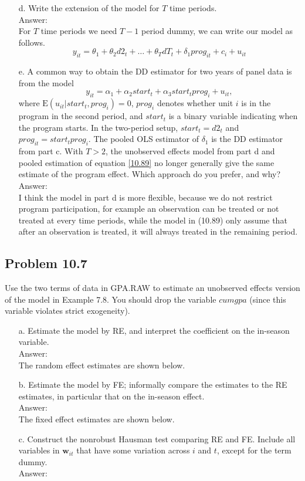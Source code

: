 \documentclass[10pt]{article}
\newcommand{\E}{\text{E}}
\begin{document}
\begin{enumerate}
\item[d.] Write the extension of the model for $T$ time periods.
\\ Answer: \\
For $T$ time periods we need $T-1$ period dummy, we can write our model as follows.
\[y_{it}=\theta_1+\theta_2d2_t+\ldots+\theta_T dT_t+\delta_1prog_{it}+c_i+u_{it}\]

\item[e.] A common way to obtain the DD estimator for two years of panel data is from the model
\[y_{it}=\alpha_1+\alpha_2 start_t+\alpha_3 start_t prog_i+u_{it}, \tag{10.89}\label{10.89}\]
where $\E(u_{it}|start_t,prog_i)=0$, $prog_i$ denotes whether unit $i$ is in the program in the second period, and $start_t$ is a binary variable indicating when the program starts. In the two-period setup, $start_t=d2_t$ and $prog_{it}=start_t prog_i$. The pooled OLS estimator of $\delta_1$ is the DD estimator from part c. With $T>2$, the unobserved effects model from part d and pooled estimation of equation \eqref{10.89} no longer generally give the same estimate of the program effect. Which approach do you prefer, and why?
\\ Answer: \\
I think the model in part d is more flexible, because we do not restrict program participation, for example an observation can be treated or not treated at every time periods, while the model in (10.89) only assume that after an observation is treated, it will always treated in the remaining period.

\end{enumerate}

\subsection*{Problem 10.7}
Use the two terms of data in GPA.RAW to estimate an unobserved effects version of the model in Example 7.8. You should drop the variable $cumgpa$ (since this variable violates strict exogeneity).
\begin{enumerate}
\item[a.] Estimate the model by RE, and interpret the coefficient on the in-season variable. 
\\ Answer: \\
The random effect estimates are shown below.\\


\item[b.] Estimate the model by FE; informally compare the estimates to the RE estimates, in particular that on the in-season effect. 
\\ Answer: \\
The fixed effect estimates are shown below.\\


\item[c.] Construct the nonrobust Hausman test comparing RE and FE. Include all variables in $\textbf{w}_{it}$ that have some variation across $i$ and $t$, except for the term dummy.
\\ Answer: \\

\end{enumerate}
\end{document}
